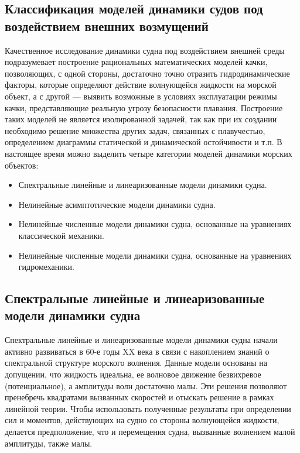 \subsection{Классификация моделей динамики судов под воздействием внешних возмущений}

Качественное исследование динамики судна под воздействием внешней среды подразумевает построение рациональных математических моделей качки, позволяющих, с одной стороны, достаточно точно отразить гидродинамические факторы, которые определяют действие волнующейся жидкости на морской объект, а с другой --- выявить возможные в условиях эксплуатации режимы качки, представляющие реальную угрозу безопасности плавания. Построение таких моделей не является изолированной задачей, так как при их создании необходимо решение множества других задач, связанных с плавучестью, определением диаграммы статической и динамической остойчивости и т.п.  В настоящее время можно выделить четыре категории моделей динамики морских объектов:

\begin{itemize}
	\item	Спектральные линейные и линеаризованные модели динамики судна.
	\item	Нелинейные асимптотические модели динамики судна.
	\item	Нелинейные численные модели динамики судна, основанные на уравнениях классической механики.
	\item	Нелинейные численные модели динамики судна, основанные на уравнениях гидромеханики.
\end{itemize}

\subsection{Спектральные линейные и линеаризованные модели динамики судна}
Спектральные линейные и линеаризованные модели динамики судна начали активно развиваться в 60-е годы XX века в связи с накоплением знаний о спектральной структуре морского волнения. Данные модели основаны на допущении, что жидкость идеальна, ее волновое движение безвихревое (потенциальное), а амплитуды волн достаточно малы. Эти решения позволяют пренебречь квадратами вызванных скоростей и отыскать решение в рамках линейной теории. Чтобы использовать полученные результаты при определении сил и моментов, действующих на судно со стороны волнующейся жидкости, делается предположение, что и перемещения судна, вызванные волнением малой амплитуды, также малы.


